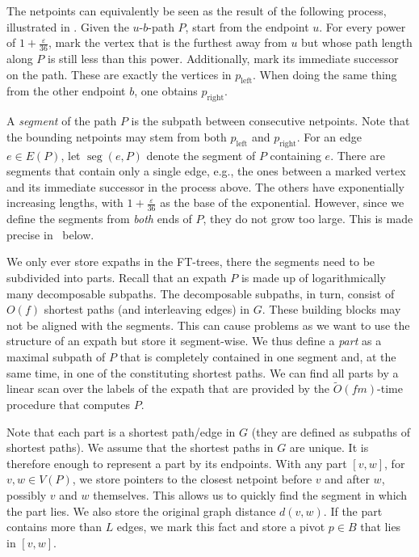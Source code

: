 \documentclass{article}\usepackage[a4paper,margin=20mm]{geometry}
\DeclareMathOperator{\seg}{seg}
\newcommand*{\Otilde}{\widetilde{O}}
\newcommand{\eps}{\varepsilon}
\begin{document}
The netpoints can equivalently be seen as the result of the following process, 
illustrated in .
Given the $u$-$b$-path $P$, start from the endpoint $u$.
For every power of $1+\tfrac{\eps}{36}$, 
mark the vertex that is the furthest away from $u$ but whose path length along $P$
is still less than this power.
Additionally, mark its immediate successor on the path.
These are exactly the vertices in $p_{\text{left}}$.
When doing the same thing from the other endpoint $b$, one obtains $p_{\text{right}}$.

A \emph{segment} of the path $P$ is the subpath between consecutive netpoints.
Note that the bounding netpoints may stem from both $p_{\text{left}}$ and $p_{\text{right}}$.
For an edge $e \in E(P)$, let $\seg(e,P)$ denote the segment of $P$ containing $e$.
There are segments that contain only a single edge,
e.g., the ones between a marked vertex and its immediate successor in the process above.
The others have exponentially increasing lengths,
with $1+ \tfrac{\eps}{36}$ as the base of the exponential.
However, since we define the segments from \emph{both} ends of $P$, they do not grow too large.
This is made precise in~ below.

We only ever store expaths in the FT-trees,
there the segments need to be subdivided into parts.
Recall that an expath $P$ is made up of logarithmically many decomposable subpaths.
The decomposable subpaths, in turn, consist of $O(f)$ shortest paths (and interleaving edges) in $G$.
These building blocks may not be aligned with the segments.
This can cause problems as we want to use the structure of an expath but store it segment-wise.
We thus define a \emph{part} as a maximal subpath of $P$
that is completely contained in one segment 
and, at the same time, in one of the constituting shortest paths.
We can find all parts by a linear scan over the labels of the expath
that are provided by the $\Otilde(fm)$-time procedure that computes $P$.

Note that each part is a shortest path/edge in $G$
(they are defined as subpaths of shortest paths).
We assume that the shortest paths  in $G$ are unique.
It is therefore enough to represent a part by its endpoints.
With any part $[v,w]$, for $v,w \in V(P)$,
we store pointers to the closest netpoint before $v$ and after $w$,
possibly $v$ and $w$ themselves.
This allows us to quickly find the segment in which the part lies.
We also store the original graph distance $d(v,w)$.
If the part contains more than $L$ edges,
we mark this fact and store a pivot $p \in B$ that lies in $[v,w]$.
\end{document}
